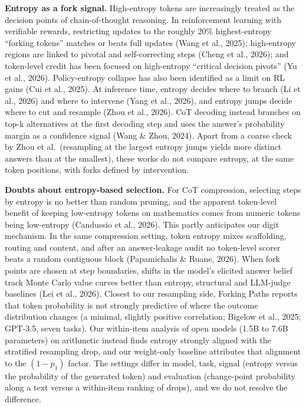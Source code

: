 \documentclass[
  10pt,
  a4paper,
]{article}
\begin{document}
\textbf{Entropy as a fork signal.} High-entropy tokens are increasingly treated as the decision points of chain-of-thought reasoning. In reinforcement learning with verifiable rewards, restricting
updates to the roughly 20\% highest-entropy ``forking tokens'' matches or beats full updates (Wang et al., 2025); high-entropy regions are linked to pivotal and self-correcting steps (Cheng et al.,
2026); and token-level credit has been focused on high-entropy ``critical decision pivots'' (Yu et al., 2026). Policy-entropy collapse has also been identified as a limit on RL gains (Cui et al.,
2025). At inference time, entropy decides where to branch (Li et al., 2026) and where to intervene (Yang et al., 2026), and entropy jumps decide where to cut and resample (Zhou et al., 2026). CoT
decoding instead branches on top-k alternatives at the first decoding step and uses the answer's probability margin as a confidence signal (Wang \& Zhou, 2024). Apart from a coarse check by Zhou et
al.~(resampling at the largest entropy jumps yields more distinct answers than at the smallest), these works do not compare entropy, at the same token positions, with forks defined by intervention.

\textbf{Doubts about entropy-based selection.} For CoT compression, selecting steps by entropy is no better than random pruning, and the apparent token-level benefit of keeping low-entropy tokens on
mathematics comes from numeric tokens being low-entropy (Candussio et al., 2026). This partly anticipates our digit mechanism. In the same compression setting, token entropy mixes scaffolding, routing
and content, and after an answer-leakage audit no token-level scorer beats a random contiguous block (Papamichalis \& Ruane, 2026). When fork points are chosen at step boundaries, shifts in the
model's elicited answer belief track Monte Carlo value curves better than entropy, structural and LLM-judge baselines (Lei et al., 2026). Closest to our resampling side, Forking Paths reports that
token probability is not strongly predictive of where the outcome distribution changes (a minimal, slightly positive correlation; Bigelow et al., 2025; GPT-3.5, seven tasks). Our within-item analysis
of open models (1.5B to 7.6B parameters) on arithmetic instead finds entropy strongly aligned with the stratified resampling drop, and our weight-only baseline attributes that alignment to the
\((1-p_1)\) factor. The settings differ in model, task, signal (entropy versus the probability of the generated token) and evaluation (change-point probability along a text versus a within-item
ranking of drops), and we do not resolve the difference.
\end{document}
